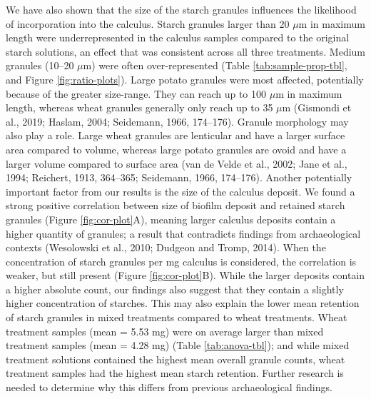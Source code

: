 \documentclass[utf8]{frontiers/frontiersSCNS}
\begin{document}
We have also shown that the size of the starch granules influences the likelihood
of incorporation into the calculus. Starch granules larger than 20 \(\mu\)m in
maximum length were underrepresented in the calculus samples compared to the original
starch solutions, an effect that was consistent across all three treatments. Medium
granules (10--20 \(\mu\)m) were often over-represented
(Table \ref{tab:sample-prop-tbl},
and
Figure \ref{fig:ratio-plots}).
Large potato granules were most affected, potentially because of the greater
size-range. They can reach up to 100 \(\mu\)m in maximum length, whereas wheat
granules generally only reach up to 35 \(\mu\)m
(Gismondi et al., 2019; Haslam, 2004; Seidemann, 1966, 174--176).
Granule morphology may also play a role. Large wheat granules
are lenticular and have a larger surface area compared
to volume, whereas large potato granules are ovoid and have a larger volume
compared to surface area
(van de Velde et al., 2002; Jane et al., 1994; Reichert, 1913, 364--365; Seidemann, 1966, 174--176).
Another potentially important factor
from our results is the size of the calculus deposit. We found a
strong positive correlation between size of biofilm deposit and
retained starch granules (Figure \ref{fig:cor-plot}A), meaning larger calculus
deposits contain a higher quantity of granules;
a result that contradicts findings from archaeological contexts
(Wesolowski et al., 2010; Dudgeon and Tromp, 2014).
When the concentration of starch granules
per mg calculus is considered, the correlation is weaker, but still present
(Figure \ref{fig:cor-plot}B).
While the larger deposits contain a higher absolute count, our findings also suggest
that they contain a slightly higher concentration of starches. This may also explain
the lower mean retention of starch granules in mixed treatments compared to
wheat treatments. Wheat treatment samples (mean = 5.53 mg) were on average larger than mixed treatment samples (mean = 4.28 mg) (Table \ref{tab:anova-tbl}); and while mixed treatment solutions contained the highest mean overall
granule counts, wheat treatment samples had the highest mean starch retention.
Further research is needed to determine why this differs from previous archaeological
findings.
\end{document}

